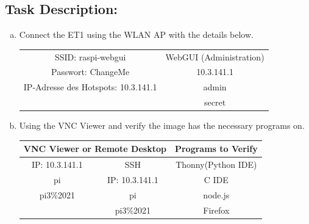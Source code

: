 

\subsection*{\Large Task Description:}
     \begin{enumerate}[a)]
        \item Connect the ET1 using the WLAN AP with the details below.
        
        \begin{center}
            \begin{tabular}{ |c|c|} 
            \hline
            SSID: raspi-webgui & WebGUI (Administration)  \\ 
            Passwort: ChangeMe & 10.3.141.1\\ 
            IP-Adresse des Hotspots: 10.3.141.1 & admin\\
            & secret \\ 
            \hline
            \end{tabular}
        \end{center}
        
        \item Using the VNC Viewer and verify the image has the necessary programs on.
        \begin{center}
            \begin{tabular}{ |c|c||c|} 
            \hline
            \multicolumn{2}{|c||}{VNC Viewer or Remote Desktop} & Programs to Verify \\
            \hline
            IP: 10.3.141.1  & SSH               & Thonny(Python IDE)  \\ 
            pi              & IP: 10.3.141.1    & C IDE\\ 
            pi3\%2021       & pi                & node.js\\
                            & pi3\%2021         & Firefox\\ 
            \hline
            \end{tabular}
        \end{center}
    \end{enumerate}